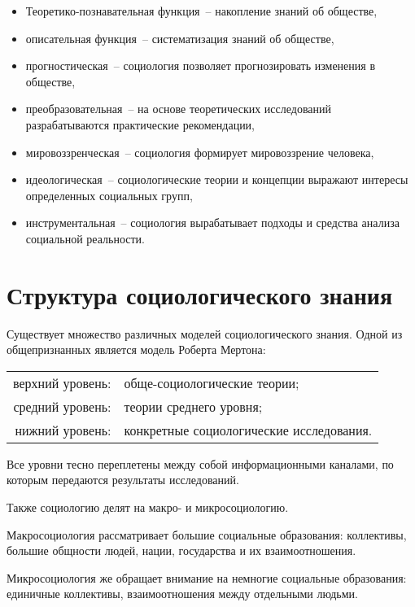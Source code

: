     \begin{itemize}
      \item Теоретико-познавательная функция~-- накопление знаний об обществе,
      \item описательная функция~-- систематизация знаний об обществе,
      \item прогностическая~-- социология позволяет прогнозировать изменения в
        обществе,
      \item преобразовательная~-- на основе теоретических исследований
        разрабатываются практические рекомендации,
      \item мировоззренческая~-- социология формирует мировоззрение человека,
      \item идеологическая~-- социологические теории и концепции выражают
        интересы определенных социальных групп,
      \item инструментальная~-- социология вырабатывает подходы и средства
        анализа социальной реальности.
    \end{itemize}

  \section{Структура социологического знания}

    Существует множество различных моделей социологического знания. Одной из
    общепризнанных является модель Роберта Мертона:
    \begin{center}
      \begin{tabular}{rl}
        верхний уровень: & обще-социологические теории; \\
        средний уровень: & теории среднего уровня; \\
         нижний уровень: & конкретные социологические исследования. \\
      \end{tabular}
    \end{center}

    Все уровни тесно переплетены между собой информационными каналами, по
    которым передаются результаты исследований.

    \bigskip

    Также социологию делят на макро- и микросоциологию.

    Макросоциология рассматривает большие социальные образования: коллективы,
    большие общности людей, нации, государства и их взаимоотношения.

    Микросоциология же обращает внимание на немногие социальные образования:
    единичные коллективы, взаимоотношения между отдельными людьми.


